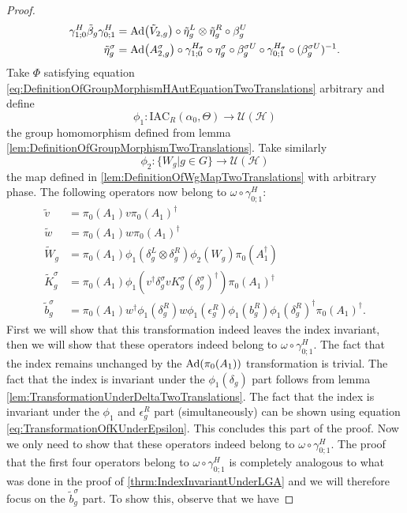 \documentclass[12pt,a4paper,twoside]{article}
\newcommand{\IAC}{\textrm{IAC}}
\let\originalleft\left
\let\originalright\right
\renewcommand{\left}{\mathopen{}\mathclose\bgroup\originalleft}
\renewcommand{\right}{\aftergroup\egroup\originalright}
\newcommand{\UU}{\mathcal U}
\newcommand{\HH}{\mathcal H}
\newcommand{\Ad}[1]{\textrm{Ad}\left(#1\right)}
\theoremstyle{definition}
\numberwithin{equation}{section}
\begin{document}
\begin{proof}
	\begin{align}
		\label{eq:IndexInvariantUnderLGAEtaTildeDefiniton1TwoTrans}
		\gamma^{H}_{1;0}\tilde{\beta}_g\gamma^{H}_{0;1}&=\Ad{\tilde V_{2,g}}\circ\tilde{\eta}_g^L\otimes\tilde{\eta}_g^R\circ\beta_g^U\\
		\label{eq:IndexInvariantUnderLGAEtaTildeDefiniton2TwoTrans}
		\tilde{\eta}_g^\sigma&=\Ad{A_{2,g}^\sigma}\circ\gamma^{H_\sigma}_{1;0}\circ\eta_g^\sigma\circ\beta_g^{\sigma U}\circ\gamma^{H_\sigma}_{0;1}\circ(\beta_g^{\sigma U})^{-1}.
	\end{align}
	Take $\Phi$ satisfying equation \ref{eq:DefinitionOfGroupMorphismHAutEquationTwoTranslations} arbitrary and define
	\begin{equation}
		\phi_1:\IAC_R(\alpha_0,\Theta) \rightarrow \UU(\HH)
	\end{equation}
	the group homomorphism defined from lemma \ref{lem:DefinitionOfGroupMorphismTwoTranslations}. Take similarly
	\begin{equation}
		\phi_2:\{W_g|g\in G\}\rightarrow \UU(\HH)
	\end{equation}
	the map defined in \ref{lem:DefinitionOfWgMapTwoTranslations} with arbitrary phase. The following operators now belong to $\omega\circ\gamma^{H}_{0;1}:$
	\begin{align}
		\tilde{v}&=\pi_0(A_1)v\pi_0(A_1)^\dagger\\
		\tilde{w}&=\pi_0(A_1)w\pi_0(A_1)^\dagger\\
		\tilde{W}_g&=\pi_0(A_1)\phi_1(\delta^L_g\otimes\delta^R_g)\phi_2( W_g)\pi_0(A_1^\dagger)\\
		\tilde{K}_g^\sigma&=\pi_0(A_1)\phi_1(v^\dagger \delta_g^\sigma v K_g^\sigma (\delta_g^\sigma)^\dagger) \pi_0(A_1)^\dagger\\
		\tilde{b}_g^\sigma&=\pi_0(A_1)w^\dagger \phi_1(\delta_g^R)w \phi_1(\epsilon_g^R)\phi_1(b_g^R)\phi_1(\delta_g^R)^\dagger\pi_0(A_1)^\dagger.
	\end{align}
	First we will show that this transformation indeed leaves the index invariant, then we will show that these operators indeed belong to $\omega\circ\gamma^H_{0;1}$. The fact that the index remains unchanged by the $\Ad{\pi_0(A_1)}$ transformation is trivial. The fact that the index is invariant under the $\phi_1(\delta_g)$ part follows from lemma \ref{lem:TransformationUnderDeltaTwoTranslations}. The fact that the index is invariant under the $\phi_1$ and $\epsilon^R_g$ part (simultaneously) can be shown using equation \eqref{eq:TransformationOfKUnderEpsilon}. This concludes this part of the proof. Now we only need to show that these operators indeed belong to $\omega\circ\gamma^H_{0;1}$. The proof that the first four operators belong to $\omega\circ\gamma^H_{0;1}$ is completely analogous to what was done in the proof of \ref{thrm:IndexInvariantUnderLGA} and we will therefore focus on the $\tilde{b}_g^\sigma$ part. To show this, observe that we have

\end{proof}
\end{document}
